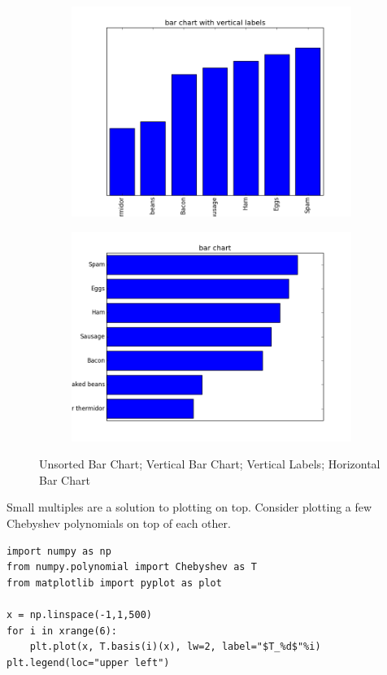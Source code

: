 \begin{figure}
\begin{subfigure}{.2\textwidth}
\end{subfigure}
\begin{subfigure}{.2\textwidth}
\centering
\includegraphics[width=\textwidth]{bar_chart_vertical_labels.png}
\end{subfigure}
\begin{subfigure}{.2\textwidth}
\centering
\includegraphics[width=\textwidth]{bar_chart.png}
\end{subfigure}
\caption{Unsorted Bar Chart; Vertical Bar Chart; Vertical Labels; Horizontal Bar Chart }
\label{fig:barcharts}
\end{figure}

Small multiples are a solution to plotting on top. Consider plotting a few Chebyshev polynomials on top of each other. 
\begin{lstlisting}
import numpy as np
from numpy.polynomial import Chebyshev as T
from matplotlib import pyplot as plot

x = np.linspace(-1,1,500)
for i in xrange(6):
	plt.plot(x, T.basis(i)(x), lw=2, label="$T_%d$"%i)
plt.legend(loc="upper left")

\end{lstlisting}

